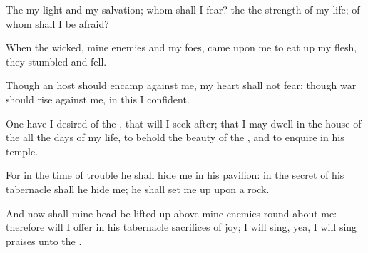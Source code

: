 {\Q {}The
{}
{} my
light and my
salvation; whom shall I
fear? the
{}
{} the
strength of my
life; of whom shall I be
afraid?


\par }{\Q {}When the
wicked,
{} mine
enemies and my
foes,
came upon me to eat
up my
flesh, they
stumbled and
fell.


\par }{\Q {}Though an
host should
encamp against me, my
heart shall not
fear: though
war should
rise against me, in this
{} I
{}
confident.


\par }{\Q {}One
{} have I
desired of the
{}, that will I
seek after; that I may
dwell in the
house of the
{} all the
days of my
life, to
behold the
beauty of the
{}, and to
enquire in his
temple.


\par }{\Q {}For in the
time of
trouble he shall
hide me in his
pavilion: in the
secret of his
tabernacle shall he
hide me; he shall set me
up upon a
rock.


\par }{\Q {}And now shall mine
head be lifted
up above mine
enemies round
about me: therefore will I
offer in his
tabernacle
sacrifices of
joy; I will
sing, yea, I will sing
praises unto the
{}.


\par }{\BB \par }
